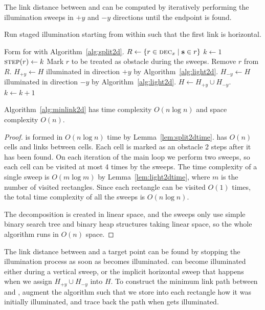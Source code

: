 \documentclass[english,gradu]{tktltiki2018}
\begin{document}
The link distance between \spt and \ept can be computed by iteratively performing the illumination sweeps in $+y$ and $-y$ directions until the endpoint is found.

\begin{alg}\label{alg:minlink2d}
Run staged illumination starting from \spt within \fspace such that the first link is horizontal.
\begin{algorithmic}
\State Form  for \fspace with Algorithm~\ref{alg:split2d}.
\State $R\gets\left\{r\in\textsc{dec}_{x} \mid \textbf{s}\in r\right\}$
\State $k\gets 1$
			\State $\textsc{step}{(r)}\gets k$
			\State Mark $r$ to be treated as obstacle during the sweeps.
			\State Remove $r$ from $R$.
		\EndIf
	\EndFor
	\State $H_{+y}\gets H$ illuminated in direction $+y$ by Algorithm~\ref{alg:light2d}.
	\State $H_{-y}\gets H$ illuminated in direction $-y$ by Algorithm~\ref{alg:light2d}.
	\State $H\gets H_{+y}\cup H_{-y}$.
	\State $k\gets k+1$
\EndWhile
\end{algorithmic}
\end{alg}

\begin{theo}Algorithm~\ref{alg:minlink2d} has time complexity $O(n\log n)$ and space complexity $O(n)$.\end{theo}
\begin{proof}
 is formed in $O(n\log n)$ time by Lemma~\ref{lem:split2dtime}.
 has $O(n)$ cells and links between cells.
Each cell is marked as an obstacle 2 steps after it has been found.
On each iteration of the main loop we perform two sweeps, so each cell can be visited at most 4 times by the sweeps.
The time complexity of a single sweep is $O(m\log m)$ by Lemma~\ref{lem:light2dtime}, where $m$ is the number of visited rectangles.
Since each rectangle can be visited $O(1)$ times, the total time complexity of all the sweeps is $O(n\log n)$.

The decomposition is created in linear space, and the sweeps only use simple binary search tree and binary heap structures taking linear space, so the whole algorithm runs in $O(n)$ space.
\end{proof}

The link distance between \spt and a target point \ept can be found by stopping the illumination process as soon as \ept becomes illuminated.
\epts can become illuminated either during a vertical sweep, or the implicit horizontal sweep that happens when we assign $H_{+y}\cup H_{-y}$ into $H$.
To construct the minimum link path between \spt and \ept, augment the algorithm such that we store into each rectangle how it was initially illuminated, and trace back the path when \ept gets illuminated.
\end{document}
